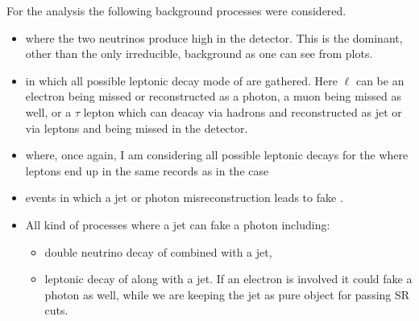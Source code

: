 For the \mph analysis the following background processes were considered.
\begin{itemize}
\item \znng where the two neutrinos produce high \met in the detector. This is the dominant, other than the only irreducible, background as one can see from plots.
\item \wg in which all possible leptonic decay mode of \Wboson are gathered. Here $\ell$ can be an electron being missed or reconstructed as a photon, a muon being missed as well, or a $\tau$ lepton which can deacay via hadrons and reconstructed as jet or via leptons and being missed in the detector.
\item \zg where, once again, I am considering all possible leptonic decays for the \Zboson where leptons end up in the same records as in the \Wboson case
\item \gj events in which a jet or photon misreconstruction leads to fake \met.
\item All kind of processes where a jet can fake a photon including:
  \begin{itemize}
  \item double neutrino decay of \Zboson combined with a jet,
  \item leptonic decay of \Wboson along with a jet. If an electron is involved it could fake a photon as well, while we are keeping the jet as pure object for passing SR cuts.
  \end{itemize}
\end{itemize}




  

  
